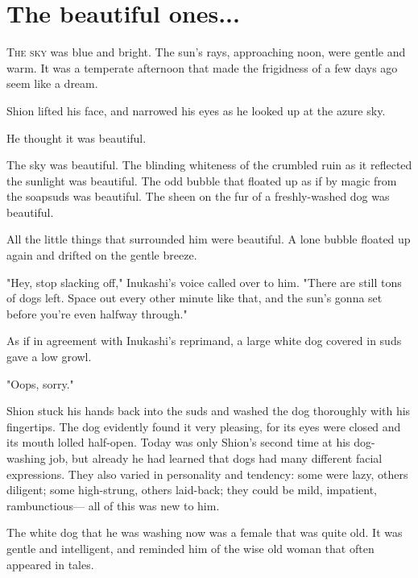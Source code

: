 
\chapter{The beautiful ones...}


\lettrine{T}{he sky} was blue and bright. The sun's rays, approaching noon, were
gentle and warm. It was a temperate afternoon that made the frigidness
of a few days ago seem like a dream.

Shion lifted his face, and narrowed his eyes as he looked up at the
azure sky.

He thought it was beautiful.

The sky was beautiful. The blinding whiteness of the crumbled ruin as it
reflected the sunlight was beautiful. The odd bubble that floated up as
if by magic from the soapsuds was beautiful. The sheen on the fur of a
freshly-washed dog was beautiful.

All the little things that surrounded him were beautiful. A lone bubble
floated up again and drifted on the gentle breeze.

"Hey, stop slacking off," Inukashi's voice called over to him. "There
are still tons of dogs left. Space out every other minute like that, and
the sun's gonna set before you're even halfway through."

As if in agreement with Inukashi's reprimand, a large white dog covered
in suds gave a low growl.

"Oops, sorry."

Shion stuck his hands back into the suds and washed the dog thoroughly
with his fingertips. The dog evidently found it very pleasing, for its
eyes were closed and its mouth lolled half-open. Today was only Shion's
second time at his dog-washing job, but already he had learned that dogs
had many different facial expressions. They also varied in personality
and tendency: some were lazy, others diligent; some high-strung, others
laid-back; they could be mild, impatient, rambunctious--- all of this was
new to him.

The white dog that he was washing now was a female that was quite old.
It was gentle and intelligent, and reminded him of the wise old woman
that often appeared in tales.

